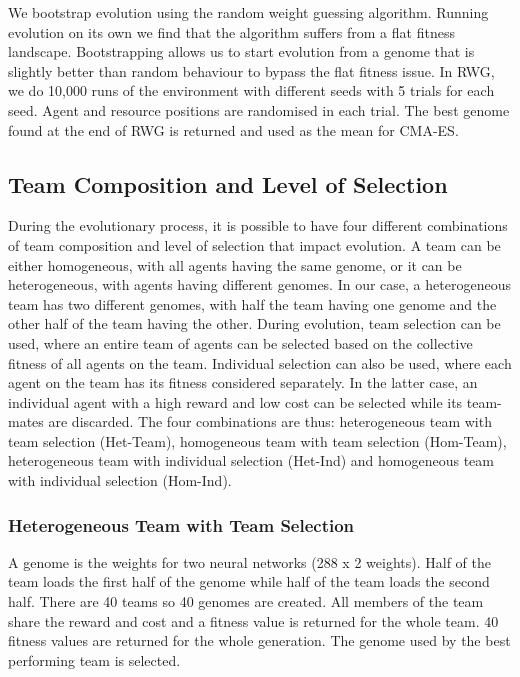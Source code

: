 \documentclass[12pt]{article}  %
\begin{document}
We bootstrap evolution using the random weight guessing algorithm. 
Running evolution on its own we find that the algorithm suffers from a flat fitness landscape.
Bootstrapping allows us to start evolution from a genome that is slightly better than random behaviour to bypass the flat fitness issue.
In RWG, we do 10,000 runs of the environment with different seeds with 5 trials for each seed. 
Agent and resource positions are randomised in each trial.
The best genome found at the end of RWG is returned and used as the mean for CMA-ES.

\subsection{Team Composition and Level of Selection}

During the evolutionary process, it is possible to have four different combinations of team composition and level of selection that impact evolution.
A team can be either homogeneous, with all agents having the same genome, or it can be heterogeneous, with agents having different genomes.
In our case, a heterogeneous team has two different genomes, with half the team having one genome and the other half of the team having the other.
During evolution, team selection can be used, where an entire team of agents can be selected based on the collective fitness of all agents on the team.
Individual selection can also be used, where each agent on the team has its fitness considered separately.
In the latter case, an individual agent with a high reward and low cost can be selected while its team-mates are discarded. 
The four combinations are thus: heterogeneous team with team selection (Het-Team), homogeneous team with team selection (Hom-Team), heterogeneous team with individual selection (Het-Ind) and homogeneous team with individual selection (Hom-Ind).\\

\subsubsection{Heterogeneous Team with Team Selection}

A genome is the weights for two neural networks (288 x 2 weights).
Half of the team loads the first half of the genome while half of the team loads the second half. 
There are 40 teams so 40 genomes are created. 
All members of the team share the reward and cost and a fitness value is returned for the whole team. 
40 fitness values are returned for the whole generation. 
The genome used by the best performing team is selected.\\
\end{document}

